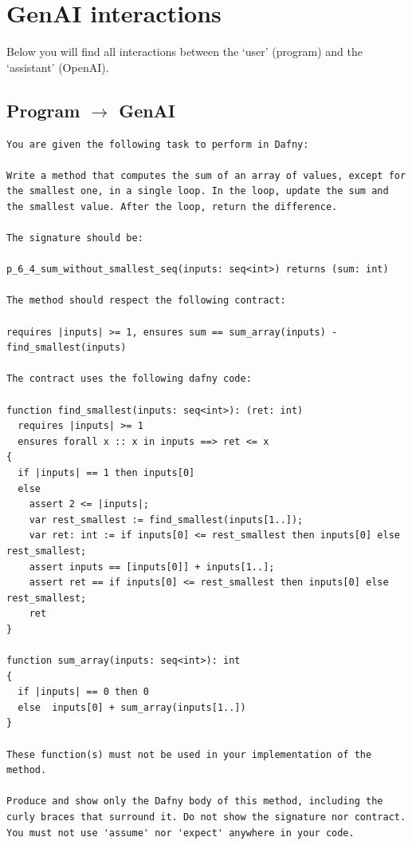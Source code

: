 \documentclass{article}
\begin{document}
\section*{GenAI interactions}
Below you will find all interactions between the `user' (program) and the `assistant' (OpenAI).
\subsection*{Program $\rightarrow$ GenAI}
\begin{lstlisting}
You are given the following task to perform in Dafny:

Write a method that computes the sum of an array of values, except for the smallest one, in a single loop. In the loop, update the sum and the smallest value. After the loop, return the difference.

The signature should be:

p_6_4_sum_without_smallest_seq(inputs: seq<int>) returns (sum: int)

The method should respect the following contract:

requires |inputs| >= 1, ensures sum == sum_array(inputs) - find_smallest(inputs)

The contract uses the following dafny code:

function find_smallest(inputs: seq<int>): (ret: int)
  requires |inputs| >= 1
  ensures forall x :: x in inputs ==> ret <= x 
{
  if |inputs| == 1 then inputs[0]
  else 
    assert 2 <= |inputs|;
    var rest_smallest := find_smallest(inputs[1..]);
    var ret: int := if inputs[0] <= rest_smallest then inputs[0] else rest_smallest;
    assert inputs == [inputs[0]] + inputs[1..]; 
    assert ret == if inputs[0] <= rest_smallest then inputs[0] else rest_smallest;
    ret 
}

function sum_array(inputs: seq<int>): int
{
  if |inputs| == 0 then 0
  else  inputs[0] + sum_array(inputs[1..])
}

These function(s) must not be used in your implementation of the method.

Produce and show only the Dafny body of this method, including the curly braces that surround it. Do not show the signature nor contract. You must not use 'assume' nor 'expect' anywhere in your code.
\end{lstlisting}
\end{document}

